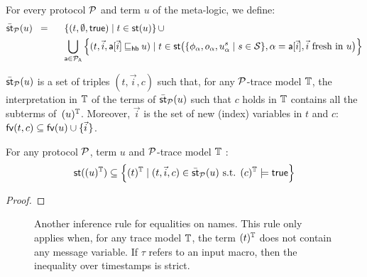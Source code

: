 \begin{definition}
  For every protocol $\calp$ and term $u$ of the meta-logic, we define:
  \begin{alignat*}{2}
    \ost_{\calp}(u) &\;\;=\;\;&&
    \left\{
      (t, \emptyset, \true) \mid t \in \st(u)
    \right\}
    \cup\\
    &&&\bigcup_{\sfa \in \calp_{\sfA}}
    \left\{
      (t, \vec{i}, \sfa[\vec{i}] \lehb u) \mid
      t \in \st\big(\{\phi_{\alpha},o_{\alpha},u^s_{\alpha} \mid s \in\States\},
      \alpha = \sfa[\vec{i}],
      \vec{i} \text{ fresh in } u 
      \big)
    \right\}
  \end{alignat*}
\end{definition}

$\ost_{\calp}(u)$ is a set of triples $(t,\vec{i},c)$ such that, for any $\calp$-trace model $\TM$, the interpretation in $\TM$ of the terms of $\ost_{\calp}(u)$ such that $c$ holds in $\TM$ contains all the subterms of~$\interp{u}^\TM$. Moreover, $\vec{i}$ is the set of new (index) variables in $t$ and $c$: $\fv{t,c} \subseteq \fv{u} \cup \{\pvec{i}\}$.
\begin{proposition}
  For any protocol $\calp$, term $u$ and $\calp$-trace model $\TM$ :
  \[
    \st(\interp{u}^\TM) \subseteq
    \left\{
      \interp{t}^\TM \mid (t,\vec{i},c) \in \ost_{\calp}(u) \text{ s.t. }
      \interp{c}^\TM \models \true
    \right\}
  \]
\end{proposition}

\begin{proof}
\end{proof}


\begin{figure}
  \begin{mathpar}
  \end{mathpar}
  \caption{Another inference rule for equalities on names.
  This rule only applies when, for any trace model $\TM$,
  the term $\interp{t}^\TM$ does not contain any message variable.
  If $\tau$ refers to an input macro, then the inequality over timestamps
  is strict.}
\end{figure}


